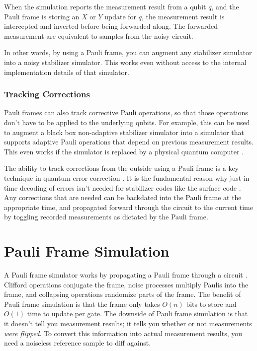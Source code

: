 \documentclass[onecolumn,unpublished]{quantumarticle}
\theoremstyle{definition}
\theoremstyle{definition}
\theoremstyle{definition}
\begin{document}
When the simulation reports the measurement result from a qubit $q$, and the Pauli frame is storing an $X$ or $Y$ update for $q$, the measurement result is intercepted and inverted before being forwarded along.
The forwarded measurement are equivalent to samples from the noisy circuit.

In other words, by using a Pauli frame, you can augment any stabilizer simulator into a noisy stabilizer simulator.
This works even without access to the internal implementation details of that simulator.

\subsubsection{Tracking Corrections}

Pauli frames can also track corrective Pauli operations, so that those operations don't have to be applied to the underlying qubits.
For example, this can be used to augment a black box non-adaptive stabilizer simulator into a simulator that supports adaptive Pauli operations that depend on previous measurement results.
This even works if the simulator is replaced by a physical quantum computer \cite{ware2017experimental}.

The ability to track corrections from the outside using a Pauli frame is a key technique in quantum error correction \cite{knill2005quantum}.
It is the fundamental reason why just-in-time decoding of errors isn't needed for stabilizer codes like the surface code \cite{fowler2012surfacecodereview}.
Any corrections that are needed can be backdated into the Pauli frame at the appropriate time, and propagated forward through the circuit to the current time by toggling recorded measurements as dictated by the Pauli frame.

\section{Pauli Frame Simulation}
\label{sec:framesim}

A Pauli frame simulator works by propagating a Pauli frame through a circuit \cite{rall2019simulation}.
Clifford operations conjugate the frame, noise processes multiply Paulis into the frame, and collapsing operations randomize parts of the frame.
The benefit of Pauli frame simulation is that the frame only takes $O(n)$ bits to store and $O(1)$ time to update per gate.
The downside of Pauli frame simulation is that it doesn't tell you measurement results; it tells you whether or not measurements {\em were flipped}.
To convert this information into actual measurement results, you need a noiseless reference sample to diff against.
\end{document}
